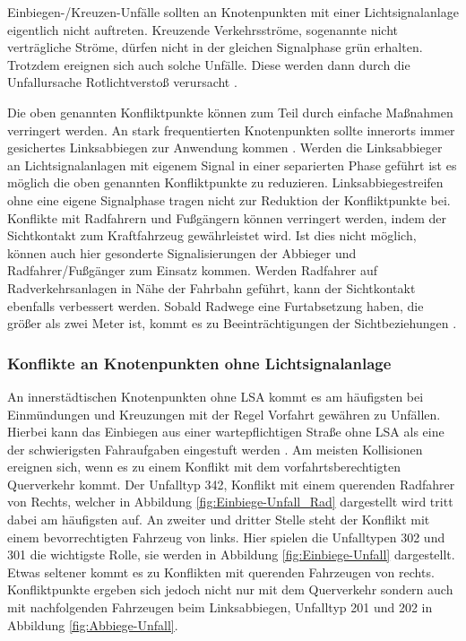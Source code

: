 Einbiegen-/Kreuzen-Unfälle sollten an Knotenpunkten mit einer Lichtsignalanlage eigentlich nicht auftreten. Kreuzende Verkehrsströme, sogenannte nicht verträgliche Ströme, dürfen nicht in der gleichen Signalphase grün erhalten. Trotzdem ereignen sich auch solche Unfälle. Diese werden dann durch die Unfallursache Rotlichtverstoß verursacht \parencite[S. 274]{Schreiber.2016}. 

Die oben genannten Konfliktpunkte können zum Teil durch einfache Maßnahmen verringert werden. An stark frequentierten Knotenpunkten sollte innerorts immer gesichertes Linksabbiegen zur Anwendung kommen \parencite[S. 275]{Schreiber.2016}. Werden die Linksabbieger an Lichtsignalanlagen mit eigenem Signal in einer separierten Phase geführt ist es möglich die oben genannten Konfliktpunkte zu reduzieren. Linksabbiegestreifen ohne eine eigene Signalphase tragen nicht zur Reduktion der Konfliktpunkte bei. 
Konflikte mit Radfahrern und Fußgängern können verringert werden, indem der Sichtkontakt zum Kraftfahrzeug gewährleistet wird. Ist dies nicht möglich, können auch hier gesonderte Signalisierungen der Abbieger und Radfahrer/Fußgänger zum Einsatz kommen. Werden Radfahrer auf Radverkehrsanlagen in Nähe der Fahrbahn geführt, kann der Sichtkontakt ebenfalls verbessert werden. Sobald Radwege eine Furtabsetzung haben, die größer als zwei Meter ist, kommt es zu Beeinträchtigungen der Sichtbeziehungen \parencite[S. 276f]{Schreiber.2016}.

\subsubsection{Konflikte an Knotenpunkten ohne Lichtsignalanlage}\label{chapter:Knotenpunkte ohne LSA}
An innerstädtischen Knotenpunkten ohne \ac{LSA} kommt es am häufigsten bei Einmündungen und Kreuzungen mit der Regel Vorfahrt gewähren zu Unfällen. Hierbei kann das Einbiegen aus einer wartepflichtigen Straße ohne \ac{LSA} als eine der schwierigsten Fahraufgaben eingestuft werden \parencite[S. 90]{Reichart.2001}. Am meisten Kollisionen ereignen sich, wenn es zu einem Konflikt mit dem vorfahrtsberechtigten Querverkehr kommt. Der Unfalltyp 342, Konflikt mit einem querenden Radfahrer von Rechts, welcher in Abbildung \ref{fig:Einbiege-Unfall_Rad} dargestellt wird tritt dabei am häufigsten auf. An zweiter und dritter Stelle steht der Konflikt mit einem bevorrechtigten Fahrzeug von links. Hier spielen die Unfalltypen 302 und 301 die wichtigste Rolle, sie werden in Abbildung \ref{fig:Einbiege-Unfall} dargestellt. Etwas seltener kommt es zu Konflikten mit querenden Fahrzeugen von rechts. Konfliktpunkte ergeben sich jedoch nicht nur mit dem Querverkehr sondern auch mit nachfolgenden Fahrzeugen beim Linksabbiegen, Unfalltyp 201 und 202 in Abbildung \ref{fig:Abbiege-Unfall}.

